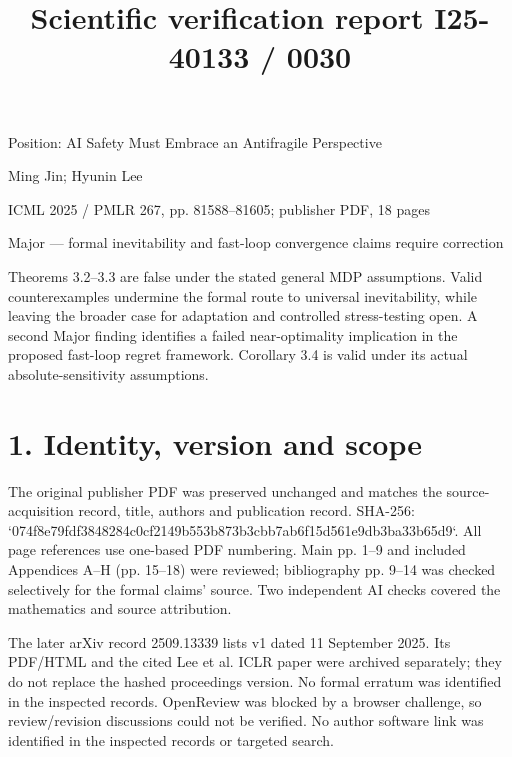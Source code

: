 \documentclass[10pt]{article}
\title{Scientific verification report
I25-40133 / 0030}
\author{}
\date{}
\begin{document}
\maketitle
Position: AI Safety Must Embrace an Antifragile Perspective\par
Ming Jin; Hyunin Lee\par
ICML 2025 / PMLR 267, pp. 81588–81605; publisher PDF, 18 pages\par
Major — formal inevitability and fast-loop convergence claims require correction\par
Theorems 3.2–3.3 are false under the stated general MDP assumptions. Valid counterexamples undermine the formal route to universal inevitability, while leaving the broader case for adaptation and controlled stress-testing open. A second Major finding identifies a failed near-optimality implication in the proposed fast-loop regret framework. Corollary 3.4 is valid under its actual absolute-sensitivity assumptions.\par
\section*{1. Identity, version and scope}
The original publisher PDF was preserved unchanged and matches the source-acquisition record, title, authors and publication record. SHA-256: `074f8e79fdf3848284c0cf2149b553b873b3cbb7ab6f15d561e9db3ba33b65d9`. All page references use one-based PDF numbering. Main pp. 1–9 and included Appendices A–H (pp. 15–18) were reviewed; bibliography pp. 9–14 was checked selectively for the formal claims’ source. Two independent AI checks covered the mathematics and source attribution.\par
The later arXiv record 2509.13339 lists v1 dated 11 September 2025. Its PDF/HTML and the cited Lee et al. ICLR paper were archived separately; they do not replace the hashed proceedings version. No formal erratum was identified in the inspected records. OpenReview was blocked by a browser challenge, so review/revision discussions could not be verified. No author software link was identified in the inspected records or targeted search.\par
\end{document}
